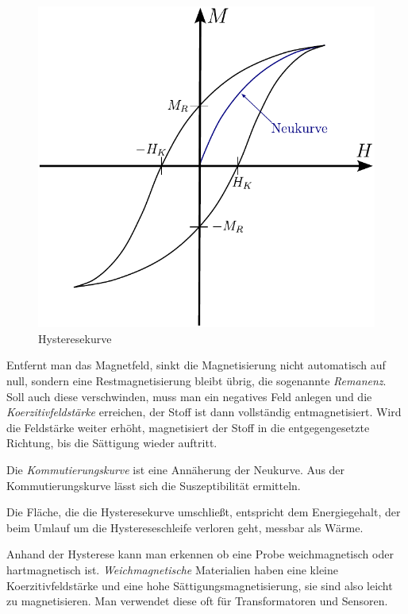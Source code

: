 \documentclass[12pt,a4paper]{scrartcl}
\numberwithin{equation}{section} %
\renewcommand{\[}{} %
\renewcommand{\]}{\noindent} %
\begin{document}
\begin{figure}
	\centering
	\includegraphics[scale=0.7]{../media/B2.4/Hysteresekurve.pdf}
	\caption{Hysteresekurve}
	\label{Abb: Hysteresekurve}
\end{figure}

Entfernt man das Magnetfeld, sinkt die Magnetisierung nicht automatisch auf null, sondern eine Restmagnetisierung bleibt übrig, die sogenannte \emph{Remanenz}. Soll auch diese verschwinden, muss man ein negatives Feld anlegen und die \emph{Koerzitivfeldstärke} erreichen, der Stoff ist dann vollständig entmagnetisiert. Wird die Feldstärke weiter erhöht, magnetisiert der Stoff in die entgegengesetzte Richtung, bis die Sättigung wieder auftritt.

Die \emph{Kommutierungskurve} ist eine Annäherung der Neukurve. Aus der Kommutierungskurve lässt sich die Suszeptibilität ermitteln.

Die Fläche, die die Hysteresekurve umschließt, entspricht dem Energiegehalt, der beim Umlauf um die Hystereseschleife verloren geht, messbar als Wärme.

Anhand der Hysterese kann man erkennen ob eine Probe weichmagnetisch oder hartmagnetisch ist. \emph{Weichmagnetische} Materialien haben eine kleine Koerzitivfeldstärke und eine hohe Sättigungsmagnetisierung, sie sind also leicht zu magnetisieren. Man verwendet diese oft für Transformatoren und Sensoren.
\end{document}
